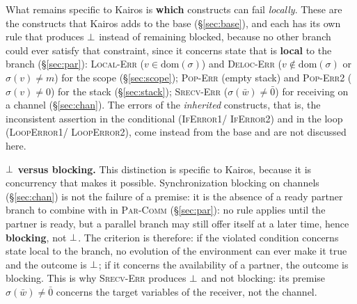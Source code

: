 \medskip
\noindent
What remains specific to Kairos is \textbf{which} constructs can
fail \emph{locally}. These are the constructs that Kairos adds to the base
(\S\ref{sec:base}), and each has its own rule that produces $\bot$ instead of
remaining blocked, because no other branch could ever satisfy that
constraint, since it concerns state that is \textbf{local} to the branch (\S\ref{sec:par}):
\textcolor{red!60!black}{\textsc{Local-Err}} ($v \in \mathrm{dom}(\sigma)$) and
\textcolor{red!60!black}{\textsc{Deloc-Err}} ($v \notin \mathrm{dom}(\sigma)$
or $\sigma(v) \neq m$) for the scope (\S\ref{sec:scope});
\textcolor{red!60!black}{\textsc{Pop-Err}} (empty stack) and
\textcolor{red!60!black}{\textsc{Pop-Err2}} ($\sigma(v) \neq 0$) for the stack
(\S\ref{sec:stack}); \textcolor{red!60!black}{\textsc{Srecv-Err}}
($\sigma(\bar w) \neq \bar 0$) for receiving on a channel (\S\ref{sec:chan}).
The errors of the \emph{inherited} constructs, that is, the inconsistent assertion
in the conditional (\textcolor{red!60!black}{\textsc{IfError1}}/%
\textcolor{red!60!black}{\textsc{IfError2}}) and in the loop
(\textcolor{red!60!black}{\textsc{LoopError1}}/%
\textcolor{red!60!black}{\textsc{LoopError2}}), come instead from the base and
are not discussed here.

\medskip
\noindent
\textbf{$\bot$ versus blocking.} This distinction is specific to Kairos, because
it is concurrency that makes it possible. Synchronization blocking on
channels (\S\ref{sec:chan}) is not the failure of a premise: it is the absence of
a ready partner branch to combine with in \textsc{Par-Comm}
(\S\ref{sec:par}): no rule applies until the partner is ready,
but a parallel branch may still offer itself at a later time, hence
\textbf{blocking}, not $\bot$. The criterion is therefore: if the violated condition
concerns state local to the branch, no evolution of the environment can ever
make it true and the outcome is $\bot$; if it concerns the availability of a partner,
the outcome is blocking. This is why
\textcolor{red!60!black}{\textsc{Srecv-Err}} produces $\bot$ and not blocking: its
premise $\sigma(\bar w) \neq \bar 0$ concerns the target variables of the
receiver, not the channel.


